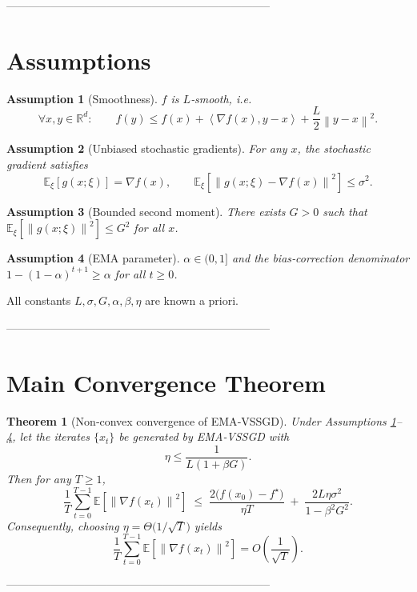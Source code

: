 \documentclass{article}
\newcommand{\E}{\mathbb{E}}
\newcommand{\R}{\mathbb{R}}
\newcommand{\norm}[1]{\left\|#1\right\|}
\newcommand{\ip}[2]{\left\langle #1,#2\right\rangle}
\newcommand{\grad}{\nabla}
\newtheorem{assumption}{Assumption}
\newtheorem{theorem}{Theorem}
\begin{document}
-----------------------------------------------------------------------

\section*{Assumptions}
\begin{assumption}[Smoothness]\label{ass:smooth}
$f$ is $L$‑smooth, i.e.
\[
\forall x,y\in\R^{d}:\qquad
f(y)\le f(x)+\ip{\grad f(x)}{y-x}+\frac{L}{2}\norm{y-x}^{2}.
\tag{A1}
\]
\end{assumption}
\begin{assumption}[Unbiased stochastic gradients]\label{ass:unbiased}
For any $x$, the stochastic gradient satisfies
\[
\E_{\xi}[g(x;\xi)] = \grad f(x),\qquad 
\E_{\xi}\!\left[\norm{g(x;\xi)-\grad f(x)}^{2}\right]\le\sigma^{2}.
\tag{A2}
\]
\end{assumption}
\begin{assumption}[Bounded second moment]\label{ass:bounded}
There exists $G>0$ such that $\E_{\xi}\!\left[\norm{g(x;\xi)}^{2}\right]\le G^{2}$ for all $x$.
\end{assumption}
\begin{assumption}[EMA parameter]\label{ass:alpha}
$\alpha\in(0,1]$ and the bias‑correction denominator $1-(1-\alpha)^{t+1}\ge \alpha$ for all $t\ge0$.
\end{assumption}
All constants $L,\sigma,G,\alpha,\beta,\eta$ are known a priori.

-----------------------------------------------------------------------

\section*{Main Convergence Theorem}
\begin{theorem}[Non‑convex convergence of EMA‑VSSGD]\label{thm:main}
Under Assumptions \ref{ass:smooth}–\ref{ass:alpha}, let the iterates $\{x_{t}\}$ be generated by EMA‑VSSGD with
\[
\eta\le\frac{1}{L(1+\beta G)}.
\]
Then for any $T\ge1$,
\[
\frac{1}{T}\sum_{t=0}^{T-1}\E\!\left[\norm{\grad f(x_{t})}^{2}\right]
\;\le\;
\frac{2\bigl(f(x_{0})-f^{\star}\bigr)}{\eta T}
\;+\;
\frac{2L\eta\sigma^{2}}{1-\beta^{2}G^{2}}.
\tag{5}
\]
Consequently, choosing $\eta = \Theta\!\bigl(1/\sqrt{T}\bigr)$ yields
\[
\frac{1}{T}\sum_{t=0}^{T-1}\E\!\left[\norm{\grad f(x_{t})}^{2}\right]
= O\!\left(\frac{1}{\sqrt{T}}\right).
\]
\end{theorem}

-----------------------------------------------------------------------
\end{document}
